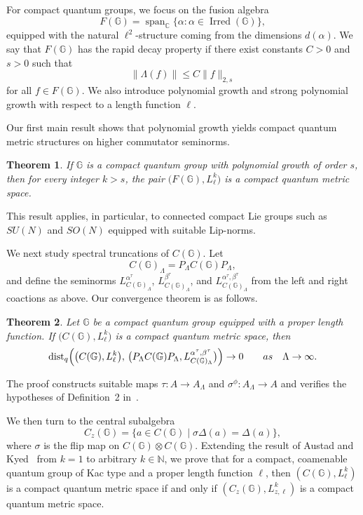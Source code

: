 \documentclass[12pt, reqno]{amsart}
\newtheorem{theorem}{Theorem}[section]
\theoremstyle{definition}
\theoremstyle{remark}
\numberwithin{equation}{section}
\DeclareMathOperator{\Irred}{Irred}
\begin{document}
For compact quantum groups, we focus on the fusion algebra
\[
F(\mathbb{G})=\operatorname{span}_{\mathbb{C}}\{\alpha:\alpha\in\Irred(\mathbb{G})\},
\]
equipped with the natural $\ell^{2}$-structure coming from the dimensions $d(\alpha)$. We say that $F(\mathbb{G})$ has the rapid decay property if there exist constants $C>0$ and $s>0$ such that
\[
\|\Lambda(f)\|\le C\|f\|_{2,s}
\]
for all $f\in F(\mathbb{G})$. We also introduce polynomial growth and strong polynomial growth with respect to a length function $\ell$.

Our first main result shows that polynomial growth yields compact quantum metric structures on higher commutator seminorms.

\begin{theorem}
If $\mathbb{G}$ is a compact quantum group with polynomial growth of order $s$, then for every integer $k>s$, the pair $\bigl(F(\mathbb{G}),L_{\ell}^{k}\bigr)$ is a compact quantum metric space.
\end{theorem}

This result applies, in particular, to connected compact Lie groups such as $SU(N)$ and $SO(N)$ equipped with suitable Lip-norms.

We next study spectral truncations of $C(\mathbb{G})$. Let
\[
C(\mathbb{G})_\Lambda=P_{\Lambda}C(\mathbb{G})P_{\Lambda},
\]
and define the seminorms $L_{C(\mathbb{G})_\Lambda}^{\alpha^\tau}$, $L_{C(\mathbb{G})_\Lambda}^{\beta^\tau}$, and $L_{C(\mathbb{G})_\Lambda}^{\alpha^\tau,\beta^\tau}$ from the left and right coactions as above. Our convergence theorem is as follows.

\begin{theorem}\label{1}
Let $\mathbb{G}$ be a compact quantum group equipped with a proper length function. If $\bigl(C(\mathbb{G}),L_{\ell}^{k}\bigr)$ is a compact quantum metric space, then 
\[
\operatorname{dist}_{q}\Bigl(
\bigl(C(\mathbb{G}),L_{\ell}^{k}\bigr),\,
\bigl(P_{\Lambda}C(\mathbb{G})P_{\Lambda},L_{C(\mathbb{G})_\Lambda}^{\alpha^\tau,\beta^\tau}\bigr)
\Bigr)\to 0 \qquad as \quad\Lambda\to \infty.
\]
\end{theorem}

The proof constructs suitable maps $\tau:A\to A_{\Lambda}$ and $\sigma^{\phi}:A_{\Lambda}\to A$ and verifies the hypotheses of Definition~2 in~\cite{5}.

We then turn to the central subalgebra
\[
C_{z}(\mathbb{G})
=
\{a\in C(\mathbb{G})\mid \sigma\Delta(a)=\Delta(a)\},
\]
where $\sigma$ is the flip map on $C(\mathbb{G})\otimes C(\mathbb{G})$. Extending the result of Austad and Kyed~\cite{16} from $k=1$ to arbitrary $k\in\mathbb{N}$, we prove that for a compact, coamenable quantum group of Kac type and a proper length function $\ell$, then $(C(\mathbb{G}), L_{\ell}^{k})$ is a compact quantum metric space if and only if $(C_{z}(\mathbb{G}), L_{z,\ell}^{k})$ is a compact quantum metric space.
\end{document}
